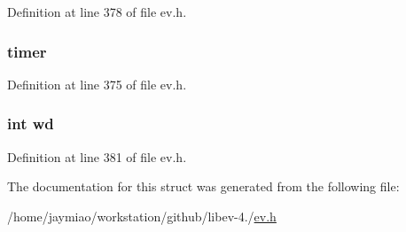 \-Definition at line 378 of file ev.\-h.

\hypertarget{structev__stat_a56d2f62405e7a2bba42204f714803c7c}{
\subsubsection[{timer}]{ {\bf timer}}}\label{structev__stat_a56d2f62405e7a2bba42204f714803c7c}


\-Definition at line 375 of file ev.\-h.

\hypertarget{structev__stat_a3707c399a8d778793ccd2c311867ac44}{
\subsubsection[{wd}]{\setlength{\rightskip}{0pt plus 5cm}int {\bf wd}}}\label{structev__stat_a3707c399a8d778793ccd2c311867ac44}


\-Definition at line 381 of file ev.\-h.



\-The documentation for this struct was generated from the following file\-:\begin{DoxyCompactItemize}
\item 
/home/jaymiao/workstation/github/libev-\/4./\hyperlink{ev_8h}{ev.\-h}\end{DoxyCompactItemize}
